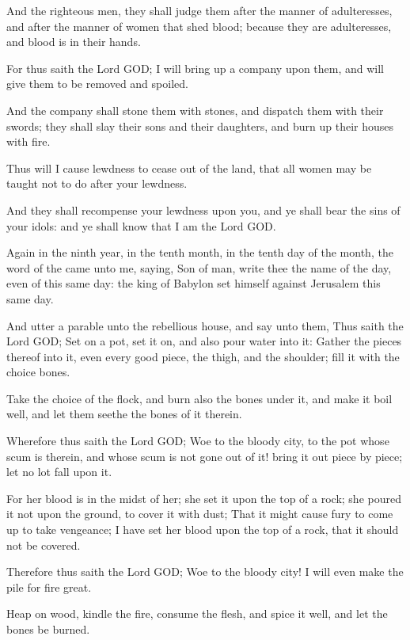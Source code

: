\Verse And the righteous men, they shall judge them after the manner of adulteresses, and after the manner of women that shed blood; because they are adulteresses, and blood is in their hands.

\Verse For thus saith the Lord GOD; I will bring up a company upon them, and will give them to be removed and spoiled.

\Verse And the company shall stone them with stones, and dispatch them with their swords; they shall slay their sons and their daughters, and burn up their houses with fire.

\Verse Thus will I cause lewdness to cease out of the land, that all women may be taught not to do after your lewdness.

\Verse And they shall recompense your lewdness upon you, and ye shall bear the sins of your idols: and ye shall know that I am the Lord GOD.


\Chapter
\Verse Again in the ninth year, in the tenth month, in the tenth day of the month, the word of the \LORD came unto me, saying, \Verse Son of man, write thee the name of the day, even of this same day: the king of Babylon set himself against Jerusalem this same day.

\Verse And utter a parable unto the rebellious house, and say unto them, Thus saith the Lord GOD; Set on a pot, set it on, and also pour water into it: \Verse Gather the pieces thereof into it, even every good piece, the thigh, and the shoulder; fill it with the choice bones.

\Verse Take the choice of the flock, and burn also the bones under it, and make it boil well, and let them seethe the bones of it therein.

\Verse Wherefore thus saith the Lord GOD; Woe to the bloody city, to the pot whose scum is therein, and whose scum is not gone out of it! bring it out piece by piece; let no lot fall upon it.

\Verse For her blood is in the midst of her; she set it upon the top of a rock; she poured it not upon the ground, to cover it with dust; \Verse That it might cause fury to come up to take vengeance; I have set her blood upon the top of a rock, that it should not be covered.

\Verse Therefore thus saith the Lord GOD; Woe to the bloody city! I will even make the pile for fire great.

\Verse Heap on wood, kindle the fire, consume the flesh, and spice it well, and let the bones be burned.

